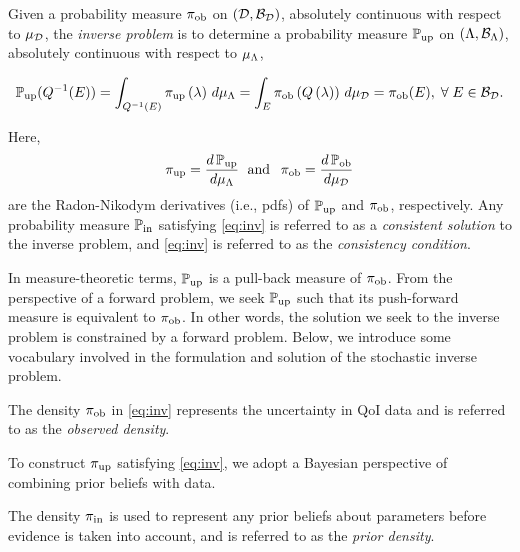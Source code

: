 \begin{defn}\label{defn:consistency}
Given a probability measure $\operatorname*{\pi_{ob}}$ on $(\mathcal{D}, \mathcal{B}_{\mathcal{D}})$, absolutely continuous with respect to $\mu_{\mathcal{D}}$, the \emph{inverse problem} is to determine a probability measure $\operatorname*{\mathbb{P}_{up}}$ on $({\Lambda}, \mathcal{B}_{{\Lambda}})$, absolutely continuous with respect to $\mu_{{\Lambda}}$, 

\begin{equation}\label{eq:inverse-problem}
\operatorname*{\mathbb{P}_{up}}(Q^{-1}(E)) = \int_{Q^{-1}(E)} \operatorname*{\pi_{up}} \left ( \lambda \right ) \, d\mu_{{\Lambda}} = \int_E \operatorname*{\pi_{ob}} \left ( Q\left ( \lambda \right ) \right ) \, d\mu_{\mathcal{D}} = \operatorname*{\pi_{ob}}(E), \; \forall \; E \in \mathcal{B}_{\mathcal{D}}.
\end{equation} 

Here, 
\begin{equation*}
\operatorname*{\pi_{up}} = \frac{d\operatorname*{\mathbb{P}_{up}}}{d\mu_{{\Lambda}}} \;\text{ and }\; \operatorname*{\pi_{ob}} = \frac{d\operatorname*{\mathbb{P}_{ob}}}{d\mu_{\mathcal{D}}}
\end{equation*}
are the Radon-Nikodym derivatives (i.e., pdfs) of $\operatorname*{\mathbb{P}_{up}}$ and $\operatorname*{\pi_{ob}}$, respectively. 
Any probability measure $\operatorname*{\mathbb{P}_{in}}$ satisfying \eqref{eq:inv} is referred to as a \emph{consistent solution} to the inverse problem, and \eqref{eq:inv} is referred to as the \emph{consistency condition}.
\end{defn}

In measure-theoretic terms, $\operatorname*{\mathbb{P}_{up}}$ is a pull-back measure of $\operatorname*{\pi_{ob}}$.
From the perspective of a forward problem, we seek $\operatorname*{\mathbb{P}_{up}}$ such that its push-forward measure is equivalent to $\operatorname*{\pi_{ob}}$. 
In other words, the solution we seek to the inverse problem is constrained by a forward problem. 
Below, we introduce some vocabulary involved in the formulation and solution of the stochastic inverse problem.

\begin{defn}\label{defn:obsden}
The density $\operatorname*{\pi_{ob}}$ in \eqref{eq:inv} represents the uncertainty in QoI data and is referred to as the \emph{observed density}.
\end{defn}

To construct $\operatorname*{\pi_{up}}$ satisfying \eqref{eq:inv}, we adopt a Bayesian perspective of combining prior beliefs with data. 

\begin{defn}\label{defn:initial}
The density $\operatorname*{\pi_{in}}$ is used to represent any prior beliefs about parameters before evidence is taken into account, and is referred to as the \emph{prior density}.
\end{defn}

